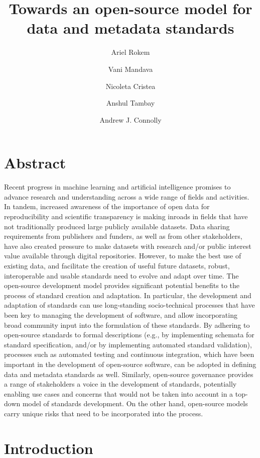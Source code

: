 \documentclass[
  letterpaper,
  DIV=11,
  numbers=noendperiod]{scrartcl}
\title{Towards an open-source model for data and metadata standards}
\author{Ariel Rokem \and Vani Mandava \and Nicoleta Cristea \and Anshul
Tambay \and Andrew J. Connolly}
\date{}
\begin{document}
\maketitle


\section{Abstract}\label{abstract}

Recent progress in machine learning and artificial intelligence promises
to advance research and understanding across a wide range of fields and
activities. In tandem, increased awareness of the importance of open
data for reproducibility and scientific transparency is making inroads
in fields that have not traditionally produced large publicly available
datasets. Data sharing requirements from publishers and funders, as well
as from other stakeholders, have also created pressure to make datasets
with research and/or public interest value available through digital
repositories. However, to make the best use of existing data, and
facilitate the creation of useful future datasets, robust, interoperable
and usable standards need to evolve and adapt over time. The open-source
development model provides significant potential benefits to the process
of standard creation and adaptation. In particular, the development and
adaptation of standards can use long-standing socio-technical processes
that have been key to managing the development of software, and allow
incorporating broad community input into the formulation of these
standards. By adhering to open-source standards to formal descriptions
(e.g., by implementing schemata for standard specification, and/or by
implementing automated standard validation), processes such as automated
testing and continuous integration, which have been important in the
development of open-source software, can be adopted in defining data and
metadata standards as well. Similarly, open-source governance provides a
range of stakeholders a voice in the development of standards,
potentially enabling use cases and concerns that would not be taken into
account in a top-down model of standards development. On the other hand,
open-source models carry unique risks that need to be incorporated into
the process.

\section{Introduction}\label{sec-intro}
\end{document}
